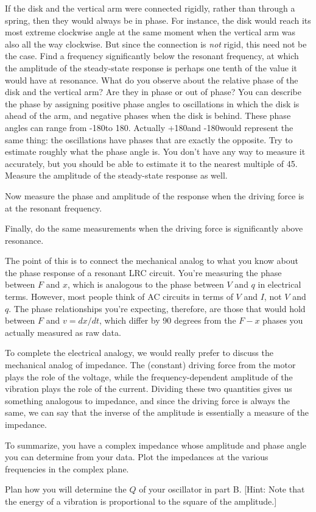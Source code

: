 If the disk and the vertical arm were connected rigidly,
rather than through a spring, then they would always be in
phase. For instance, the disk would reach its most extreme
clockwise angle at the same moment when the vertical arm was
also all the way clockwise. But since the connection is
\emph{not} rigid, this need not be the case. Find a
frequency significantly below the resonant frequency, at
which the amplitude of the steady-state response is perhaps
one tenth of the value it would have at resonance. What do
you observe about the relative phase of the disk and the
vertical arm? Are they in phase or out of phase? You can
describe the phase by assigning positive phase angles to
oscillations in which the disk is ahead of the arm, and
negative phases when the disk is behind. These phase angles
can range from -180\degunit to 180\degunit. Actually
+180\degunit and -180\degunit would represent the same
thing: the oscillations have phases that are exactly the
opposite. Try to estimate roughly what the phase angle is.
You don't have any way to measure it accurately, but you
should be able to estimate it to the nearest multiple of
45\degunit. Measure the amplitude of the steady-state response as well.

Now measure the phase and amplitude of the response when the
driving force is at the resonant frequency.

Finally, do the same measurements when the driving force is
significantly above resonance.

\analysis

The point of this is to connect the mechanical analog to what
you know about the phase response of a resonant LRC circuit.
You're measuring the phase between $F$ and $x$, which is
analogous to the phase between $V$ and $q$ in electrical
terms. However, most people think of AC circuits in terms of
$V$ and $I$, not $V$ and $q$. The phase relationships you're
expecting, therefore, are those that would hold between
$F$ and $v=dx/dt$, which differ by 90 degrees from the
$F-x$ phases you actually measured as raw data.

To complete the electrical analogy, we would really prefer to
discuss the mechanical analog of impedance. The (constant) driving force from
the motor plays the role of the voltage, while the frequency-dependent
amplitude of the vibration plays the role of the current. Dividing these
two quantities gives us something analogous to impedance, and since
the driving force is always  the same, we can say that the inverse of
the amplitude is essentially a measure of the impedance.

To summarize, you have a complex impedance whose amplitude and
phase angle you can determine from your data. Plot the impedances
at the various frequencies in the complex plane.

\prelab

\prelabquestion  Plan how you will determine the $Q$ of your oscillator
in part B. [Hint: Note that the energy of a vibration is
proportional to the square of the amplitude.]
